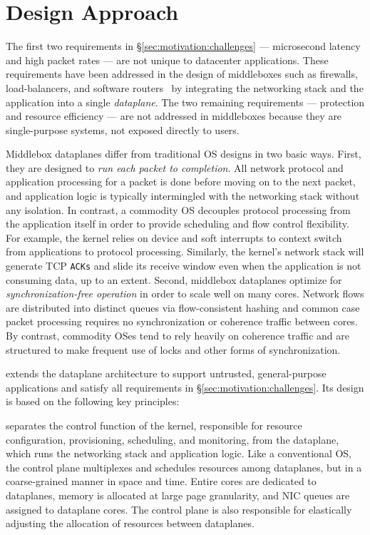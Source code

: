 \section{\ix Design Approach}
\label{sec:design}

The first two requirements in \S\ref{sec:motivation:challenges} ---
microsecond latency and high packet rates --- are not unique to
datacenter applications. These requirements have been addressed in the
design of middleboxes such as firewalls, load-balancers, and software
routers~\cite{routebricks,click} by integrating the networking stack
and the application into a single \emph{dataplane}. The two remaining
requirements --- protection and resource efficiency --- are not
addressed in middleboxes because they are single-purpose systems, not
exposed directly to users.

Middlebox dataplanes differ from traditional OS designs in two basic
ways. First, they are designed to \emph{run each packet to
  completion}.  All network protocol and application processing for a
packet is done before moving on to the next packet, and 
application logic is typically intermingled with the networking stack
without any isolation. 
In contrast, a
commodity OS decouples protocol processing from the application itself
in order to provide scheduling and flow control flexibility.  For
example, the kernel relies on device and soft interrupts to context
switch from applications to protocol processing. Similarly, the
kernel's network stack will generate TCP \texttt{ACKs} and slide its
receive window even when the application is not consuming data, up to
an extent. 
Second, middlebox dataplanes optimize for \emph{synchronization-free
  operation} in order to scale well on many cores. Network flows are
distributed into distinct queues via flow-consistent hashing and common case packet processing requires no
synchronization or coherence traffic between cores.
By contrast, commodity OSes tend to rely heavily on coherence traffic and are structured to make frequent use of locks and other forms of synchronization.

\ix extends the dataplane architecture to support untrusted, general-purpose
applications and satisfy all requirements in
\S\ref{sec:motivation:challenges}. Its design is based on the
following key principles:


 \ix
separates the control function of the kernel, responsible for resource
configuration, provisioning, scheduling, and monitoring, from the
dataplane, which runs the networking stack and application logic.
Like a conventional OS, the control plane multiplexes and schedules
resources among dataplanes, but in a coarse-grained manner in space
and time. Entire cores are dedicated to dataplanes, memory is
allocated at large page granularity, and NIC queues are assigned to
dataplane cores. The control plane is also responsible for elastically
adjusting the allocation of resources between dataplanes.

